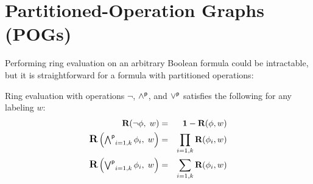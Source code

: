\documentclass[letterpaper,USenglish,cleveref, autoref, thm-restate]{lipics-v2021}
\newcommand{\pand}{\mathbin{\land^{\sf p}}}
\newcommand{\por}{\mathbin{\lor^{\sf p}}}
\DeclareMathOperator*{\Pand}{\bigwedge^{\sf p}}
\DeclareMathOperator*{\Por}{\bigvee^{\sf p}}
\newcommand{\boolnot}{\neg}
\newcommand{\rep}{\textbf{R}}
\newcommand{\mulident}{\textbf{1}}
\begin{document}

\section{Partitioned-Operation Graphs (POGs)}

Performing ring evaluation on an arbitrary Boolean formula could be intractable, but it is straightforward for a formula with partitioned operations:
\begin{proposition}
\label{prop:ring:eval}
Ring evaluation with operations $\boolnot$, $\pand$, and $\por$ satisfies the following for any labeling $w$:
\begin{eqnarray}
\textstyle
\rep(\boolnot \phi,\; w) &=& \mulident - \rep(\phi, w) \label{eqn:ring:negation} \\
\textstyle
{\Large \rep}\left(\Pand_{i=1,k} \phi_i,\; w \right) &=& \prod_{i=1,k} \rep(\phi_i, w) \label{eqn:ring:product} \\
\textstyle
{\Large \rep}\left(\Por_{i=1,k} \phi_i,\; w\right) &=& \sum_{i=1,k} \rep(\phi_i, w) \label{eqn:ring:sum}
\end{eqnarray}
\end{proposition}
\end{document}
